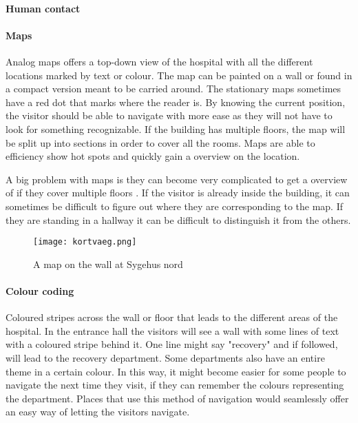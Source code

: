\paragraph{Human contact}

\paragraph{Maps}
Analog maps\cite{map} offers a top-down view of the hospital with all the different locations marked by text or colour\cite{art_Osborne}. The map can be painted on a wall\cite{wall_map} or found in a compact version meant to be carried around. The stationary maps sometimes have a red dot that marks where the reader is. By knowing the current position, the visitor should be able to navigate with more ease\cite{map_survey} as they will not have to look for something recognizable. If the building has multiple floors, the map will be split up into sections in order to cover all the rooms.
Maps are able to efficiency show hot spots and quickly gain a overview on the location\cite{pros_analog_map}.

A big problem with maps is they can become very complicated to get a overview of if they cover multiple floors \cite{map_confusing}. If the visitor is already inside the building, it can sometimes be difficult to figure out where they are corresponding to the map. If they are standing in a hallway it can be difficult to distinguish it from the others. 

  \begin{figure}[ht!]
  \centering
  \texttt{[image: kortvaeg.png]}
  \caption{A map on the wall at Sygehus nord}
  \label{overflow}
  \end{figure}
\paragraph{Colour coding}
Coloured stripes across the wall or floor that leads to the different areas of the hospital. In the entrance hall the visitors will see a wall with some lines of text with a coloured stripe behind it. One line might say "recovery" and if followed, will lead to the recovery department. Some departments also have an entire theme in a certain colour. In this way, it might become easier for some people to navigate the next time they visit, if they can remember the colours representing the department. 
Places that use this method of navigation would seamlessly offer an easy way of letting the visitors navigate.

